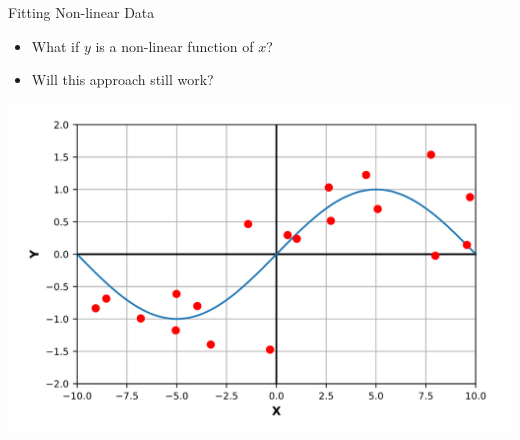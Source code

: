 \begin{frame}{Fitting Non-linear Data}
\begin{itemize}
    \item What if $y$ is a non-linear function of $x$? 
    \item Will this approach still work?
\end{itemize}

\begin{center}
    \includegraphics[width=0.75\linewidth]{images/linear-regression/linear-regression-11.png}
\end{center}
\end{frame}
